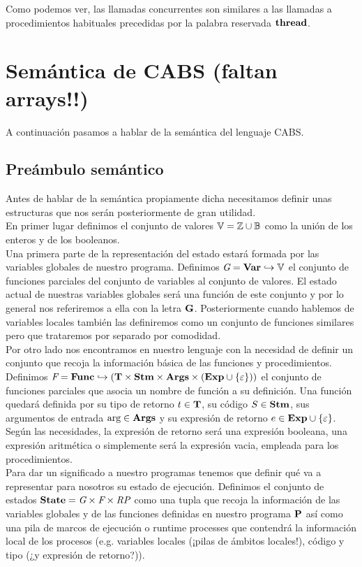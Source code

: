 
Como podemos ver, las llamadas concurrentes son similares a las llamadas a procedimientos habituales precedidas por la palabra reservada $\thread$.

\section{Semántica de CABS (faltan arrays!!)}
A continuación pasamos a hablar de la semántica del lenguaje CABS.
\subsection{Preámbulo semántico}
Antes de hablar de la semántica propiamente dicha necesitamos definir unas estructuras que nos serán posteriormente de gran utilidad.\\

En primer lugar definimos el conjunto de valores $\V = \Z \cup \B$ como la unión de los enteros y de los booleanos.\\

Una primera parte de la representación del estado estará formada por las variables globales de nuestro programa. Definimos $\Gs = \Var \hookrightarrow \V$ el conjunto de funciones parciales del conjunto de variables al conjunto de valores. El estado actual de nuestras variables globales será una función de este conjunto y por lo general nos referiremos a ella con la letra $\G$. Posteriormente cuando hablemos de variables locales también las definiremos como un conjunto de funciones similares pero que trataremos por separado por comodidad.\\

Por otro lado nos encontramos en nuestro lenguaje con la necesidad de definir un conjunto que recoja la información básica de las funciones y procedimientos. Definimos $\Fs = \Func \hookrightarrow (\T \times \Stm \times \Args \times (\Exp \cup \{\varepsilon\}))$ el conjunto de funciones parciales que asocia un nombre de función a su definición. Una función quedará definida por su tipo de retorno $t \in \T$, su código $S \in \Stm$, sus argumentos de entrada $\args \in \Args$ y su expresión de retorno $e \in \Exp \cup \{\varepsilon\}$. Según las necesidades, la expresión de retorno será una expresión booleana, una expresión aritmética o simplemente será la expresión vacia, empleada para los procedimientos.\\

Para dar un significado a nuestro programas tenemos que definir qué va a representar para nosotros su estado de ejecución. Definimos el conjunto de estados $\State = \Gs \times \Fs \times \RPs$ como una tupla que recoja la información de las variables globales y de las funciones definidas en nuestro programa $\P$ así como una pila de marcos de ejecución o runtime processes que contendrá la información local de los procesos (e.g. variables locales (¡pilas de ámbitos locales!), código y tipo (¿y expresión de retorno?)).\\

